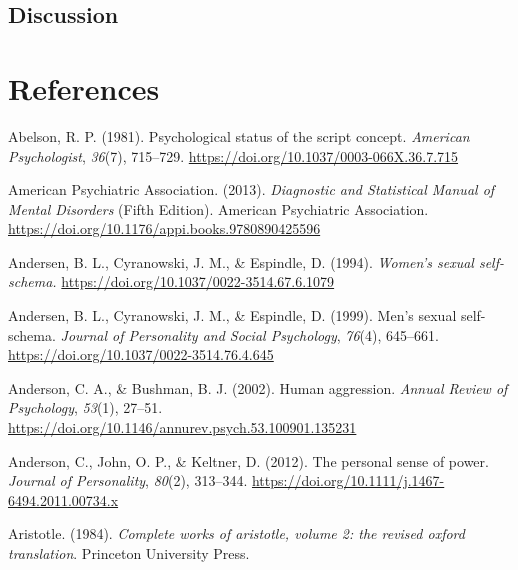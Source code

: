 \documentclass[
  donotrepeattitle,doc, 12pt, a4paper,floatsintext]{apa7}
\newlength{\cslhangindent}
\newlength{\cslentryspacingunit} %
\newenvironment{CSLReferences}[2] %
 {%
  \setlength{\parindent}{0pt}
  \ifodd #1
  \let\oldpar\par
  \def\par{\hangindent=\cslhangindent\oldpar}
  \fi
  \setlength{\parskip}{#2\cslentryspacingunit}
 }%
 {}
\begin{document}
\hypertarget{discussion-3}{%
\subsection{Discussion}\label{discussion-3}}

\newpage

\hypertarget{references}{%
\section{References}\label{references}}

\begingroup
\setlength{\parindent}{-0.5in}
\setlength{\leftskip}{0.5in}

\hypertarget{refs}{}
\begin{CSLReferences}{1}{0}
\leavevmode{}%
Abelson, R. P. (1981). Psychological status of the script concept. \emph{American Psychologist}, \emph{36}(7), 715--729. \url{https://doi.org/10.1037/0003-066X.36.7.715}

\leavevmode{}%
American Psychiatric Association. (2013). \emph{Diagnostic and Statistical Manual of Mental Disorders} (Fifth Edition). American Psychiatric Association. \url{https://doi.org/10.1176/appi.books.9780890425596}

\leavevmode{}%
Andersen, B. L., Cyranowski, J. M., \& Espindle, D. (1994). \emph{Women's sexual self-schema.} \url{https://doi.org/10.1037/0022-3514.67.6.1079}

\leavevmode{}%
Andersen, B. L., Cyranowski, J. M., \& Espindle, D. (1999). Men's sexual self-schema. \emph{Journal of Personality and Social Psychology}, \emph{76}(4), 645--661. \url{https://doi.org/10.1037/0022-3514.76.4.645}

\leavevmode{}%
Anderson, C. A., \& Bushman, B. J. (2002). Human aggression. \emph{Annual Review of Psychology}, \emph{53}(1), 27--51. \url{https://doi.org/10.1146/annurev.psych.53.100901.135231}

\leavevmode{}%
Anderson, C., John, O. P., \& Keltner, D. (2012). The personal sense of power. \emph{Journal of Personality}, \emph{80}(2), 313--344. \url{https://doi.org/10.1111/j.1467-6494.2011.00734.x}

\leavevmode{}%
Aristotle. (1984). \emph{Complete works of aristotle, volume 2: the revised oxford translation}. Princeton University Press.


\end{CSLReferences}
\end{document}
